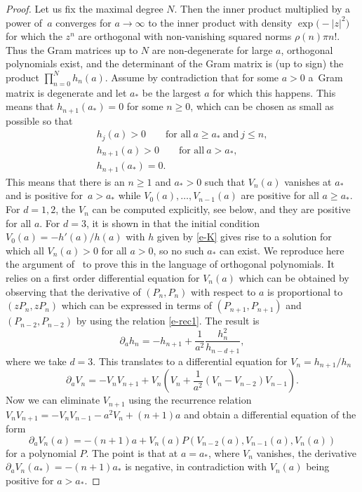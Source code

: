 \documentclass[10pt,a4paper]{amsart}
\numberwithin{equation}{section}
\theoremstyle{definition}
\begin{document}
\begin{proof} Let us fix the maximal degree $N$. Then the inner product multiplied by a power of~$a$ converges for $a\to\infty$ to the inner product with density $\exp\bigl(-|z|^2\bigr)$ for which the $z^n$ are orthogonal with non-vanishing squared norms $\rho(n)\pi n!$. Thus the Gram matrices up to $N$ are non-degenerate for large $a$, orthogonal polynomials exist, and the determinant of the Gram matrix is (up to sign) the product $\prod_{n=0}^Nh_n(a)$. Assume by contradiction that for some $a>0$ a~Gram matrix is degenerate and let $a_*$ be the largest $a$ for which this happens. This means that $h_{n+1}(a_*)=0$ for some $n\geq0$, which can be chosen as small as possible so that
\begin{gather*}
h_{j}(a)>0 \qquad\text{for all}\ a\geq a_* \ \text{and}\ j\leq n,
\\
h_{n+1}(a)>0\qquad \text{for all}\ a>a_*,
 \\
 h_{n+1}(a_*)=0.
\end{gather*}
This means that there is an $n\geq1$ and $a_*>0$ such that $V_n(a)$ vanishes at $a_*$ and is positive for~${a>a_*}$ while $V_0(a),\dots,V_{n-1}(a)$ are positive for all $a\geq a_*$. For $d=1,2$, the $V_n$ can be computed explicitly, see below, and they are positive for all $a$. For $d=3$, it is shown in \cite{CDHM2025,Hoppe2025} that the initial condition $V_0(a)=-h'(a)/h(a)$ with $h$ given by \eqref{e-K} gives rise to a solution for which all $V_n(a)>0$ for all $a>0$, so no such $a_*$ can exist.
We reproduce here the argument of~\cite{Hoppe2025} to prove this in the language of orthogonal polynomials. It relies on a first order differential equation for $V_n(a)$ which can be obtained by observing that the derivative of $(P_n,P_n)$ with respect to $a$ is proportional to $(zP_n,zP_n)$ which can be expressed in terms of $(P_{n+1},P_{n+1})$ and~${(P_{n-2},P_{n-2})}$ by using the relation \eqref{e-rec1}. The result is
\[
\partial_ah_n=-h_{n+1}+\frac1{a^2}\frac{h_n^2}{h_{n-d+1}},
\]
where we take $d=3$. This translates to a differential equation for $V_n=h_{n+1}/h_n$
\[
\partial_aV_n=-V_nV_{n+1} +V_n\left(V_n+\frac1{a^2}(V_n-V_{n-2})V_{n-1}\right).
\]
Now we can eliminate $V_{n+1}$ using the recurrence relation $V_nV_{n+1}=-V_nV_{n-1}-a^2V_n+(n+1)a$ and obtain a differential equation of the form
\[
\partial_aV_n(a)=-(n+1)a+V_n(a) P(V_{n-2}(a),V_{n-1}(a),V_n(a))
\]
for a polynomial $P$. The point is that at $a=a_*$, where $V_n$ vanishes, the derivative $\partial_aV_n(a_*)=-(n+1)a_*$ is negative, in contradiction with $V_n(a)$ being positive for $a>a_*$.
\end{proof}
\end{document}

